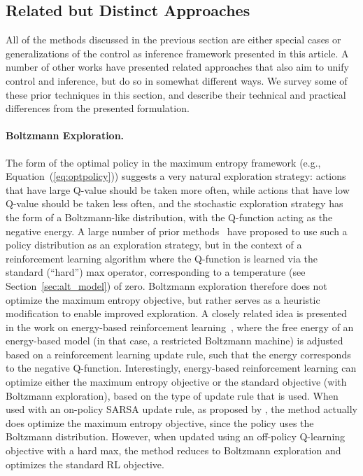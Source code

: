 \subsection{Related but Distinct Approaches}
\label{sec:distinct}

All of the methods discussed in the previous section are either special cases or generalizations of the control as inference framework presented in this article. A number of other works have presented related approaches that also aim to unify control and inference, but do so in somewhat different ways. We survey some of these prior techniques in this section, and describe their technical and practical differences from the presented formulation.

\paragraph{Boltzmann Exploration.} The form of the optimal policy in the maximum entropy framework (e.g., Equation~(\ref{eq:optpolicy})) suggests a very natural exploration strategy: actions that have large Q-value should be taken more often, while actions that have low Q-value should be taken less often, and the stochastic exploration strategy has the form of a Boltzmann-like distribution, with the Q-function acting as the negative energy. A large number of prior methods~\citep{suttonadp,KLMSurvey} have proposed to use such a policy distribution as an exploration strategy, but in the context of a reinforcement learning algorithm where the Q-function is learned via the standard (``hard'') max operator, corresponding to a temperature (see Section~\ref{sec:alt_model}) of zero. Boltzmann exploration therefore does not optimize the maximum entropy objective, but rather serves as a heuristic modification to enable improved exploration. A closely related idea is presented in the work on energy-based reinforcement learning~\citep{sallans,ebrl}, where the free energy of an energy-based model (in that case, a restricted Boltzmann machine) is adjusted based on a reinforcement learning update rule, such that the energy corresponds to the negative Q-function. Interestingly, energy-based reinforcement learning can optimize either the maximum entropy objective or the standard objective (with Boltzmann exploration), based on the type of update rule that is used. When used with an on-policy SARSA update rule, as proposed by \citet{sallans}, the method actually does optimize the maximum entropy objective, since the policy uses the Boltzmann distribution. However, when updated using an off-policy Q-learning objective with a hard max, the method reduces to Boltzmann exploration and optimizes the standard RL objective.

